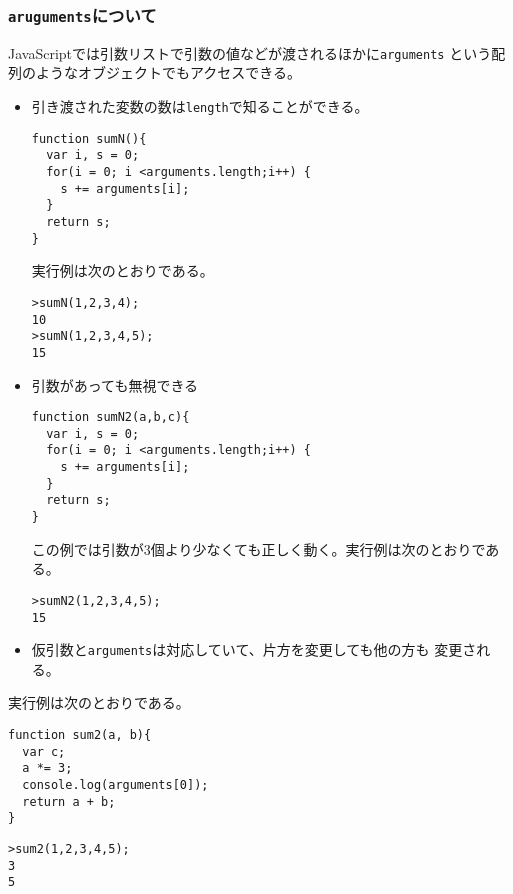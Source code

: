 \documentclass[a4j]{jarticle}
\begin{document}
\subsubsection{\protect\texttt{aruguments}について}
JavaScriptでは引数リストで引数の値などが渡されるほかに\texttt{arguments}
という配列のようなオブジェクトでもアクセスできる。
\begin{itemize}
 \item 引き渡された変数の数は\verb+length+で知ることができる。
\begin{Verbatim}
function sumN(){
  var i, s = 0;
  for(i = 0; i <arguments.length;i++) {
    s += arguments[i];
  }
  return s;
}
\end{Verbatim}
実行例は次のとおりである。
\begin{Verbatim}
>sumN(1,2,3,4);
10
>sumN(1,2,3,4,5);
15
\end{Verbatim}
 \item 引数があっても無視できる
\begin{Verbatim}
function sumN2(a,b,c){
  var i, s = 0;
  for(i = 0; i <arguments.length;i++) {
    s += arguments[i];
  }
  return s;
}
\end{Verbatim}
この例では引数が3個より少なくても正しく動く。実行例は次のとおりである。
\begin{Verbatim}
>sumN2(1,2,3,4,5);
15

\end{Verbatim}
 \item 仮引数と\verb+arguments+は対応していて、片方を変更しても他の方も
       変更される。
\end{itemize}
実行例は次のとおりである。
\begin{Verbatim}
function sum2(a, b){
  var c;
  a *= 3;
  console.log(arguments[0]);
  return a + b;
}
\end{Verbatim}
\begin{Verbatim}
>sum2(1,2,3,4,5);
3 
5
\end{Verbatim}
\end{document}
